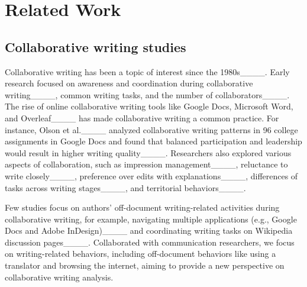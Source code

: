 \section{Related Work}
\label{relatedWork}

\subsection{Collaborative writing studies}

Collaborative writing has been a topic of interest since the 1980s____. Early research focused on awareness and coordination during collaborative writing____, common writing tasks, and the number of collaborators____. The rise of online collaborative writing tools like Google Docs, Microsoft Word, and Overleaf____ has made collaborative writing a common practice. For instance, Olson et al.____ analyzed collaborative writing patterns in 96 college assignments in Google Docs and found that balanced participation and leadership would result in higher writing quality____. Researchers also explored various aspects of collaboration, such as impression management____, reluctance to write closely____,
preference over edits with explanations____, differences of tasks across writing stages____, and territorial behaviors____.

Few studies focus on authors' off-document writing-related activities during collaborative writing, for example, navigating multiple applications (e.g., Google Docs and Adobe InDesign)____ and coordinating writing tasks on Wikipedia discussion pages____. 
Collaborated with communication researchers, we focus on writing-related behaviors, including off-document behaviors like using a translator and browsing the internet, aiming to provide a new perspective on collaborative writing analysis. 


